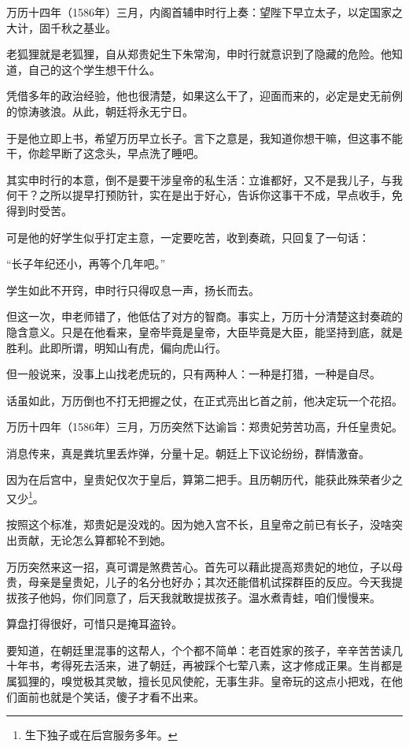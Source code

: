 \begin{multicols}{\theparacolNo}
		万历十四年（1586年）三月，内阁首辅申时行上奏：望陛下早立太子，以定国家之大计，固千秋之基业。

		老狐狸就是老狐狸，自从郑贵妃生下朱常洵，申时行就意识到了隐藏的危险。他知道，自己的这个学生想干什么。

		凭借多年的政治经验，他也很清楚，如果这么干了，迎面而来的，必定是史无前例的惊涛骇浪。从此，朝廷将永无宁日。

		于是他立即上书，希望万历早立长子。言下之意是，我知道你想干嘛，但这事不能干，你趁早断了这念头，早点洗了睡吧。

		其实申时行的本意，倒不是要干涉皇帝的私生活：立谁都好，又不是我儿子，与我何干？之所以提早打预防针，实在是出于好心，告诉你这事干不成，早点收手，免得到时受苦。

		可是他的好学生似乎打定主意，一定要吃苦，收到奏疏，只回复了一句话：

		“长子年纪还小，再等个几年吧。”

		学生如此不开窍，申时行只得叹息一声，扬长而去。

		但这一次，申老师错了，他低估了对方的智商。事实上，万历十分清楚这封奏疏的隐含意义。只是在他看来，皇帝毕竟是皇帝，大臣毕竟是大臣，能坚持到底，就是胜利。此即所谓，明知山有虎，偏向虎山行。

		但一般说来，没事上山找老虎玩的，只有两种人：一种是打猎，一种是自尽。

		话虽如此，万历倒也不打无把握之仗，在正式亮出匕首之前，他决定玩一个花招。

		万历十四年（1586年）三月，万历突然下达谕旨：郑贵妃劳苦功高，升任皇贵妃。

		消息传来，真是粪坑里丢炸弹，分量十足。朝廷上下议论纷纷，群情激奋。

		因为在后宫中，皇贵妃仅次于皇后，算第二把手。且历朝历代，能获此殊荣者少之又少\footnote{生下独子或在后宫服务多年。}。

		按照这个标准，郑贵妃是没戏的。因为她入宫不长，且皇帝之前已有长子，没啥突出贡献，无论怎么算都轮不到她。

		万历突然来这一招，真可谓是煞费苦心。首先可以藉此提高郑贵妃的地位，子以母贵，母亲是皇贵妃，儿子的名分也好办；其次还能借机试探群臣的反应。今天我提拔孩子他妈，你们同意了，后天我就敢提拔孩子。温水煮青蛙，咱们慢慢来。

		算盘打得很好，可惜只是掩耳盗铃。

		要知道，在朝廷里混事的这帮人，个个都不简单：老百姓家的孩子，辛辛苦苦读几十年书，考得死去活来，进了朝廷，再被踩个七荤八素，这才修成正果。生肖都是属狐狸的，嗅觉极其灵敏，擅长见风使舵，无事生非。皇帝玩的这点小把戏，在他们面前也就是个笑话，傻子才看不出来。


\end{multicols}
